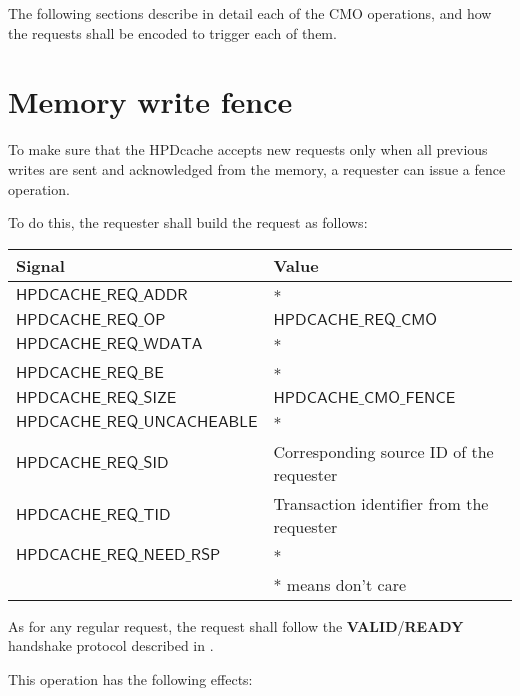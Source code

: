 \documentclass[10pt,titlepage,twoside]{book}
\begin{document}
The following sections describe in detail each of the \ac{CMO} operations, and how the requests shall be encoded to trigger each of them.


\newpage
\section{Memory write fence}

To make sure that the \ac{HPDcache} accepts new requests only when all previous writes are sent and acknowledged from the memory, a requester can issue a fence operation.

To do this, the requester shall build the request as follows:

{\centering\footnotesize\begin{tabular}{p{.38\linewidth}p{.55\linewidth}}
  \toprule
  \textbf{Signal}
  & \textbf{Value} \\
  \midrule
  $\mathsf{HPDCACHE\_REQ\_ADDR}$
  & *\\
  \midrule
  $\mathsf{HPDCACHE\_REQ\_OP}$
  & $\mathsf{HPDCACHE\_REQ\_CMO}$ \\
  \midrule
  $\mathsf{HPDCACHE\_REQ\_WDATA}$
  & *\\
  \midrule
  $\mathsf{HPDCACHE\_REQ\_BE}$
  & *\\
  \midrule
  $\mathsf{HPDCACHE\_REQ\_SIZE}$
  & $\mathsf{HPDCACHE\_CMO\_FENCE}$ \\
  \midrule
  $\mathsf{HPDCACHE\_REQ\_UNCACHEABLE}$
  & *\\
  \midrule
  $\mathsf{HPDCACHE\_REQ\_SID}$
  & Corresponding source ID of the requester\\
  \midrule
  $\mathsf{HPDCACHE\_REQ\_TID}$
  & Transaction identifier from the requester\\
  \midrule
  $\mathsf{HPDCACHE\_REQ\_NEED\_RSP}$
  & *\\
  \bottomrule
  & * means don't care \\
\end{tabular}}

As for any regular request, the request shall follow the \textbf{VALID}/\textbf{READY} handshake protocol described in .

This operation has the following effects:
\begin{itemize}
\item All open entries in the write buffer (write requests waiting to be sent to the memory) are immediately closed;
\item No new requests from any requester are acknowledged until all pending write requests in the cache have been acknowledged on the \ac{NoC} interface.
\end{itemize}
\end{document}
